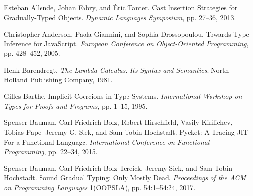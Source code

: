 \documentclass[screen=true, 10pt, acmsmall]{acmart}
\newenvironment{SingleColumn}{\begin{list}{}{\topsep=0pt\partopsep=0pt%
\listparindent=0pt\itemindent=0pt\labelwidth=0pt\leftmargin=0pt\rightmargin=0pt%
\itemsep=0pt\parsep=0pt}\item}{\end{list}}
\newenvironment{AutoBibliography}{\begin{small}}{\end{small}}
\newcommand{\Autobibentry}[1]{\hspace{0.05\linewidth}\parbox[t]{0.95\linewidth}{\parindent=-0.05\linewidth#1\vspace{1.0ex}}}
\begin{document}
\begin{AutoBibliography}
\begin{SingleColumn}
\label{t:x28autobib_x22Esteban_Allendex2c_Johan_Fabryx2c_and_xc9ric_TanterCast_Insertion_Strategies_for_Graduallyx2dTyped_ObjectsDynamic_Languages_Symposiumx2c_ppx2e_27x2dx2d362013x22x29}\Autobibentry{Esteban Allende, Johan Fabry, and \'{E}ric Tanter. Cast Insertion Strategies for Gradually{-}Typed Objects. \textit{Dynamic Languages Symposium}, pp. 27{--}36, 2013.}

\label{t:x28autobib_x22Christopher_Andersonx2c_Paola_Gianninix2c_and_Sophia_DrossopoulouTowards_Type_Inference_for_JavaScriptEuropean_Conference_on_Objectx2dOriented_Programmingx2c_ppx2e_428x2dx2d4522005x22x29}\Autobibentry{Christopher Anderson, Paola Giannini, and Sophia Drossopoulou. Towards Type Inference for JavaScript. \textit{European Conference on Object{-}Oriented Programming}, pp. 428{--}452, 2005.}

\label{t:x28autobib_x22Henk_BarendregtThe_Lambda_Calculusx3a_Its_Syntax_and_SemanticsNorthx2dHolland_Publishing_Company1981x22x29}\Autobibentry{Henk Barendregt. \textit{The Lambda Calculus: Its Syntax and Semantics}. North{-}Holland Publishing Company, 1981.}

\label{t:x28autobib_x22Gilles_BartheImplicit_Coercions_in_Type_SystemsInternational_Workshop_on_Types_for_Proofs_and_Programsx2c_ppx2e_1x2dx2d151995x22x29}\Autobibentry{Gilles Barthe. Implicit Coercions in Type Systems. \textit{International Workshop on Types for Proofs and Programs}, pp. 1{--}15, 1995.}

\label{t:x28autobib_x22Spenser_Baumanx2c_Carl_Friedrich_Bolzx2c_Robert_Hirschfieldx2c_Vasily_Kirilichevx2c_Tobias_Papex2c_Jeremy_Gx2e_Siekx2c_and_Sam_Tobinx2dHochstadtPycketx3a_A_Tracing_JIT_For_a_Functional_LanguageInternational_Conference_on_Functional_Programmingx2c_ppx2e_22x2dx2d342015x22x29}\Autobibentry{Spenser Bauman, Carl Friedrich Bolz, Robert Hirschfield, Vasily Kirilichev, Tobias Pape, Jeremy G. Siek, and Sam Tobin{-}Hochstadt. Pycket: A Tracing JIT For a Functional Language. \textit{International Conference on Functional Programming}, pp. 22{--}34, 2015.}

\label{t:x28autobib_x22Spenser_Baumanx2c_Carl_Friedrich_Bolzx2dTereickx2c_Jeremy_Siekx2c_and_Sam_Tobinx2dHochstadtSound_Gradual_Typingx3a_Only_Mostly_DeadProceedings_of_the_ACM_on_Programming_Languages_1x28OOPSLAx29x2c_ppx2e_54x3a1x2dx2d54x3a242017x22x29}\Autobibentry{Spenser Bauman, Carl Friedrich Bolz{-}Tereick, Jeremy Siek, and Sam Tobin{-}Hochstadt. Sound Gradual Typing: Only Mostly Dead. \textit{Proceedings of the ACM on Programming Languages} 1(OOPSLA), pp. 54:1{--}54:24, 2017.}


\end{SingleColumn}
\end{AutoBibliography}
\end{document}
